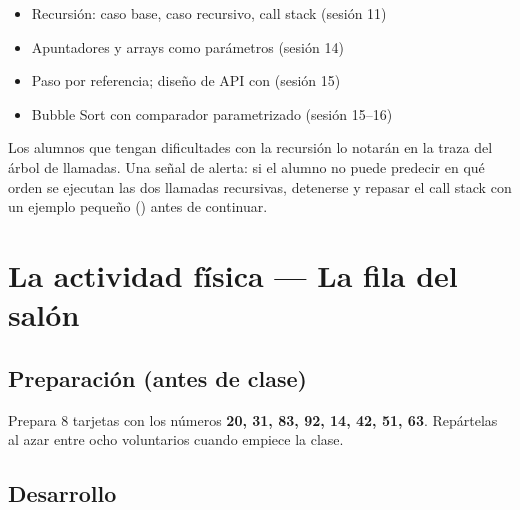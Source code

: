 \documentclass[12pt, oneside]{article}
\begin{document}
\begin{itemize}
  \item Recursión: caso base, caso recursivo, call stack (sesión 11)
  \item Apuntadores y arrays como parámetros (sesión 14)
  \item Paso por referencia; diseño de API con  (sesión 15)
  \item Bubble Sort con comparador parametrizado (sesión 15--16)
\end{itemize}

\begin{notaprofesor}
  Los alumnos que tengan dificultades con la recursión lo notarán en la traza
  del árbol de llamadas. Una señal de alerta: si el alumno no puede predecir
  en qué orden se ejecutan las dos llamadas recursivas, detenerse y repasar
  el call stack con un ejemplo pequeño () antes
  de continuar.
\end{notaprofesor}

\section{La actividad física — La fila del salón}

\subsection{Preparación (antes de clase)}

Prepara 8 tarjetas con los números \textbf{20, 31, 83, 92, 14, 42, 51, 63}.
Repártelas al azar entre ocho voluntarios cuando empiece la clase.

\subsection{Desarrollo}
\end{document}
